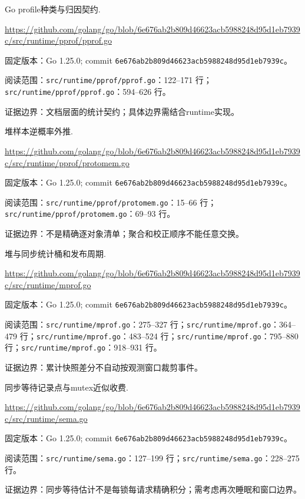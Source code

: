 \documentclass[UTF8,fontset=fandol,openany,11pt]{ctexbook}
\begin{document}
\begin{thebibliography}{999}
 Go profile种类与归因契约.\par
\url{https://github.com/golang/go/blob/6e676ab2b809d46623acb5988248d95d1eb7939c/src/runtime/pprof/pprof.go}\par
{\small\raggedright 固定版本：Go 1.25.0; commit \texttt{6e676ab2\allowbreak{}b809d466\allowbreak{}23acb598\allowbreak{}8248d95d\allowbreak{}1eb7939c}。\par
阅读范围：\nolinkurl{src/runtime/pprof/pprof.go}：122–171 行；\nolinkurl{src/runtime/pprof/pprof.go}：594–626 行。\par
证据边界：文档层面的统计契约；具体边界需结合runtime实现。
}

 堆样本逆概率外推.\par
\url{https://github.com/golang/go/blob/6e676ab2b809d46623acb5988248d95d1eb7939c/src/runtime/pprof/protomem.go}\par
{\small\raggedright 固定版本：Go 1.25.0; commit \texttt{6e676ab2\allowbreak{}b809d466\allowbreak{}23acb598\allowbreak{}8248d95d\allowbreak{}1eb7939c}。\par
阅读范围：\nolinkurl{src/runtime/pprof/protomem.go}：15–66 行；\nolinkurl{src/runtime/pprof/protomem.go}：69–93 行。\par
证据边界：不是精确逐对象清单；聚合和校正顺序不能任意交换。
}

 堆与同步统计桶和发布周期.\par
\url{https://github.com/golang/go/blob/6e676ab2b809d46623acb5988248d95d1eb7939c/src/runtime/mprof.go}\par
{\small\raggedright 固定版本：Go 1.25.0; commit \texttt{6e676ab2\allowbreak{}b809d466\allowbreak{}23acb598\allowbreak{}8248d95d\allowbreak{}1eb7939c}。\par
阅读范围：\nolinkurl{src/runtime/mprof.go}：275–327 行；\nolinkurl{src/runtime/mprof.go}：364–479 行；\nolinkurl{src/runtime/mprof.go}：483–524 行；\nolinkurl{src/runtime/mprof.go}：795–880 行；\nolinkurl{src/runtime/mprof.go}：918–931 行。\par
证据边界：累计快照差分不自动按观测窗口裁剪事件。
}

 同步等待记录点与mutex近似收费.\par
\url{https://github.com/golang/go/blob/6e676ab2b809d46623acb5988248d95d1eb7939c/src/runtime/sema.go}\par
{\small\raggedright 固定版本：Go 1.25.0; commit \texttt{6e676ab2\allowbreak{}b809d466\allowbreak{}23acb598\allowbreak{}8248d95d\allowbreak{}1eb7939c}。\par
阅读范围：\nolinkurl{src/runtime/sema.go}：127–199 行；\nolinkurl{src/runtime/sema.go}：228–275 行。\par
证据边界：同步等待估计不是每锁每请求精确积分；需考虑再次睡眠和窗口边界。
}


\end{thebibliography}
\end{document}

